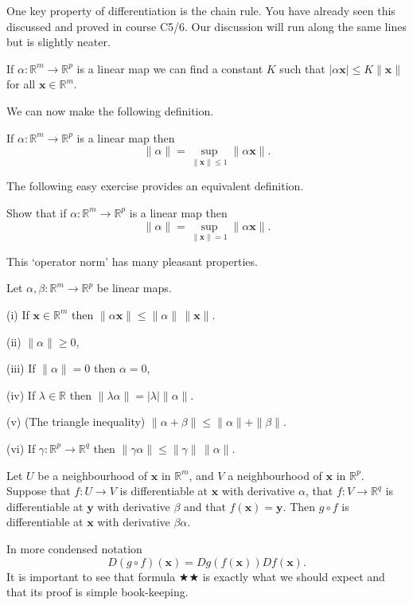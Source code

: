 One key property of differentiation is the chain
rule. You have already seen this discussed and proved
in course C5/6.  Our discussion will run along the same lines
but is slightly neater.
\begin{lemma} If
$\alpha:{\mathbb R}^{m}\rightarrow{\mathbb R}^{p}$ 
is a linear map we can find a constant $K$
such that $|\alpha{\mathbf x}|\leq K\|{\mathbf x}\|$
for all ${\mathbf x}\in {\mathbb R}^{m}$.
\end{lemma}
We can now make the following definition.
\begin{definition}\label{Definition operator norm}
If
$\alpha:{\mathbb R}^{m}\rightarrow{\mathbb R}^{p}$
is a linear map then
\[\|\alpha\|=\sup_{\|{\mathbf x}\|\leq 1}\|\alpha{\mathbf x}\|.\]
\end{definition}
The following easy exercise provides an equivalent definition.
\begin{exercise} Show that if
$\alpha:{\mathbb R}^{m}\rightarrow{\mathbb R}^{p}$
is a linear map then 
\[\|\alpha\|=\sup_{\|{\mathbf x}\|= 1}\|\alpha{\mathbf x}\|.\]
\end{exercise}
This `operator norm' has many pleasant properties.
\begin{lemma}\label{Operator norm}
Let  $\alpha,\beta:{\mathbb R}^{m}\rightarrow{\mathbb R}^{p}$
be linear maps.

(i) If ${\mathbf x}\in{\mathbb R}^{m}$ then
$\|\alpha{\mathbf x}\|\leq\|\alpha\|\,\|{\mathbf x}\|$.

(ii) $\|\alpha\|\geq 0$,

(iii) If  $\|\alpha\|= 0$ then $\alpha=0$,

(iv) If $\lambda\in{\mathbb R}$
then $\|\lambda \alpha\|=|\lambda|\|\alpha\|$.

(v) (The triangle inequality)
$\|\alpha+\beta\|\leq\|\alpha\|+\|\beta\|$.

(vi) If $\gamma:{\mathbb R}^{p}\rightarrow{\mathbb R}^{q}$
then $\|\gamma\alpha\|\leq\|\gamma\|\,\|\alpha\|$.
\end{lemma}

\begin{lemma} Let $U$ be a neighbourhood
of ${\mathbf x}$ in ${\mathbb R}^{m}$, and
$V$ a neighbourhood of ${\mathbf x}$ in ${\mathbb R}^{p}$.
Suppose that $f:U\rightarrow V$ is differentiable
at ${\mathbf x}$ with derivative $\alpha$, that
$f:V\rightarrow {\mathbb R}^{q}$ is differentiable
at ${\mathbf y}$ with derivative $\beta$ and that
$f({\mathbf x})={\mathbf y}$. Then $g\circ f$ is
differentiable at ${\mathbf x}$ with derivative
$\beta\alpha$.
\end{lemma}
In more condensed notation
\begin{equation*}
D(g\circ f)({\mathbf x})=Dg(f({\mathbf x}))Df({\mathbf x}).
\tag*{$\bigstar\bigstar$}
\end{equation*}
It is important to see that formula $\bigstar\bigstar$
is exactly what we should expect and that its proof
is simple book-keeping.

